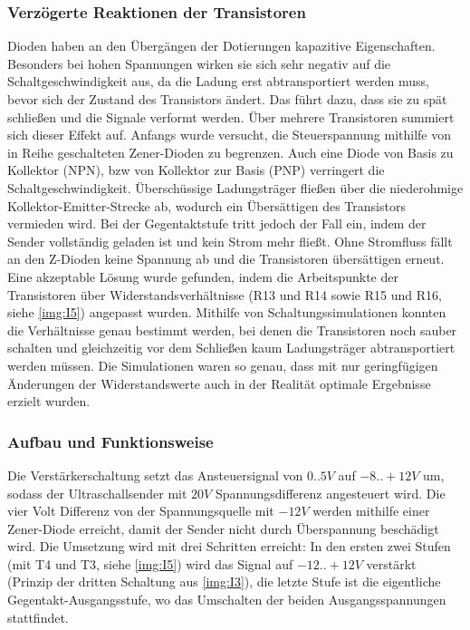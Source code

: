 \subsubsection{Verzögerte Reaktionen der Transistoren}
Dioden haben an den Übergängen der Dotierungen kapazitive Eigenschaften. Besonders bei hohen Spannungen wirken sie sich sehr negativ auf die Schaltgeschwindigkeit aus, da die Ladung erst abtransportiert werden muss, bevor sich der Zustand des Transistors ändert. Das führt dazu, dass sie zu spät schließen und die Signale verformt werden. Über mehrere Transistoren summiert sich dieser Effekt auf. Anfangs wurde versucht, die Steuerspannung mithilfe von in Reihe geschalteten Zener-Dioden zu begrenzen. Auch eine Diode von Basis zu Kollektor (NPN), bzw von Kollektor zur Basis (PNP) verringert die Schaltgeschwindigkeit. Überschüssige Ladungsträger fließen über die niederohmige Kollektor-Emitter-Strecke ab, wodurch ein Übersättigen des Transistors vermieden wird. Bei der Gegentaktstufe tritt jedoch der Fall ein, indem der Sender vollständig geladen ist und kein Strom mehr fließt. Ohne Stromfluss fällt an den Z-Dioden keine Spannung ab und die Transistoren übersättigen erneut.\\ %
Eine akzeptable Lösung wurde gefunden, indem die Arbeitspunkte der Transistoren über Widerstandsverhältnisse (R13 und R14 sowie R15 und R16, siehe \ref{img:I5}) angepasst wurden. Mithilfe von Schaltungssimulationen konnten die Verhältnisse genau bestimmt werden, bei denen die Transistoren noch sauber schalten und gleichzeitig vor dem Schließen kaum Ladungsträger abtransportiert werden müssen. Die Simulationen waren so genau, dass mit nur geringfügigen Änderungen der Widerstandswerte auch in der Realität optimale Ergebnisse erzielt wurden.

\subsubsection{Aufbau und Funktionsweise}
Die Verstärkerschaltung setzt das Ansteuersignal von $0..5V$ auf $-8..+12V$ um, sodass der Ultraschallsender mit $20V$ Spannungsdifferenz angesteuert wird. Die vier Volt Differenz von der Spannungsquelle mit $-12V$ werden mithilfe einer Zener-Diode erreicht, damit der Sender nicht durch Überspannung beschädigt wird. Die Umsetzung wird mit drei Schritten erreicht: In den ersten zwei Stufen (mit T4 und T3, siehe \ref{img:I5}) wird das Signal auf $-12..+12V$ verstärkt (Prinzip der dritten Schaltung aus \ref{img:I3}), die letzte Stufe ist die eigentliche Gegentakt-Ausgangsstufe, wo das Umschalten der beiden Ausgangsspannungen stattfindet.


